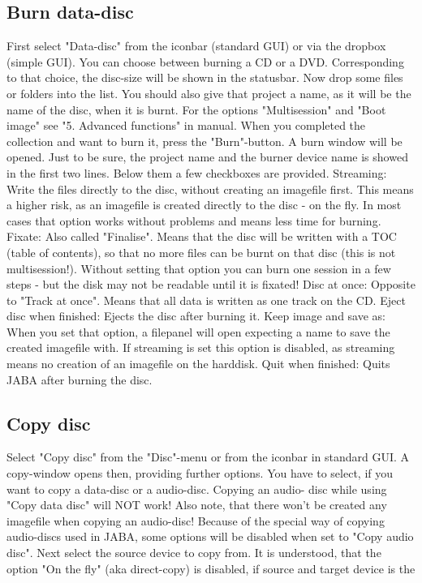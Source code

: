 \documentclass[a4paper,11pt]{article}
\begin{document}
\subsection{Burn data-disc}

First select "Data-disc" from the iconbar (standard GUI) or via the dropbox (simple
GUI).
You can choose between burning a CD or a DVD. Corresponding to that choice, the
disc-size will be shown in the statusbar.
Now drop some files or folders into the list. You should also give that project a name, as
it will be the name of the disc, when it is burnt.
For the options "Multisession" and "Boot image" see "5. Advanced functions" in
manual.
When you completed the collection and want to burn it, press the "Burn"-button. A burn
window will be opened.
Just to be sure, the project name and the burner device name is showed in the first two
lines. Below them a few checkboxes are provided.
Streaming:
Write the files directly to the disc, without creating an imagefile first.
This means a higher risk, as an imagefile is created directly to the disc - on the fly.
In most cases that option works without problems and means less time for burning.
Fixate:
Also called "Finalise". Means that the disc will be written with a TOC (table of
contents), so that no more files can be burnt on that disc (this is not multisession!).
Without setting that option you can burn one session in a few steps - but the disk may
not be readable until it is fixated!
Disc at once:
Opposite to "Track at once". Means that all data is written as one track on the CD.
Eject disc when finished:
Ejects the disc after burning it.
Keep image and save as:
When you set that option, a filepanel will open expecting a name to save the created
imagefile with.
If streaming is set this option is disabled, as streaming means no creation of an imagefile
on the harddisk.
Quit when finished:
Quits JABA after burning the disc.

\subsection{Copy disc}

Select "Copy disc" from the "Disc"-menu or from the iconbar in standard GUI.
A copy-window opens then, providing further options.
You have to select, if you want to copy a data-disc or a audio-disc. Copying an audio-
disc while using "Copy data disc" will NOT work! Also note, that there won't be created
any imagefile when copying an audio-disc!
Because of the special way of copying audio-discs used in JABA, some options will be
disabled when set to "Copy audio disc".
Next select the source device to copy from. It is understood, that the option "On the fly"
(aka direct-copy) is disabled, if source and target device is the
\end{document}
